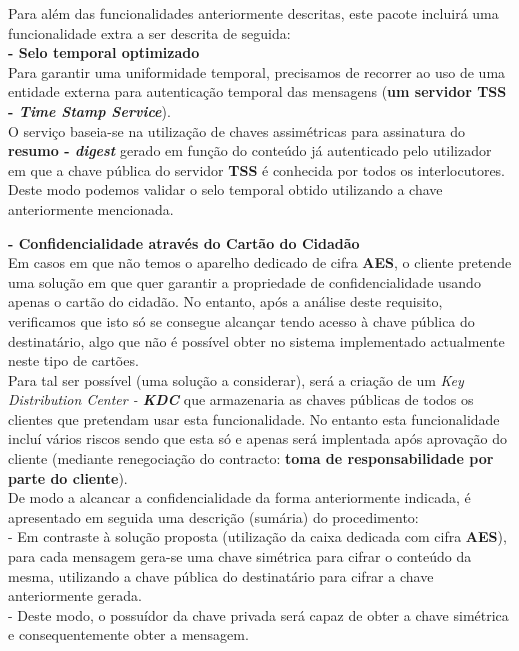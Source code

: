 \documentclass[times, 10pt,twocolumn]{article}
\begin{document}

Para al\'em das funcionalidades anteriormente descritas, este pacote incluir\'a uma funcionalidade extra a ser descrita de seguida:\\

\noindent \textbf{- Selo temporal optimizado}\\
\indent Para garantir uma uniformidade temporal, precisamos de recorrer ao uso de uma entidade externa para autentica\c{c}\~ao temporal das mensagens (\textbf{um servidor TSS - \emph{Time Stamp Service}}). \\
\indent O servi\c{c}o baseia-se na utiliza\c{c}\~ao de chaves assim\'etricas para assinatura do \textbf{resumo - \emph{digest}} gerado em fun\c{c}\~ao do conte\'udo j\'a autenticado pelo utilizador em que a chave p\'ublica do servidor \textbf{TSS} \'e conhecida por todos os interlocutores. Deste modo podemos validar o selo temporal obtido utilizando a chave anteriormente mencionada.


\noindent \textbf{- Confidencialidade atrav\'es do Cart\~ao do Cidad\~ao}\\
\indent Em casos em que n\~ao temos o aparelho dedicado de cifra \textbf{AES}, o cliente pretende uma solu\c{c}\~ao em que quer garantir a propriedade de confidencialidade usando apenas o cart\~ao do cidad\~ao. No entanto, ap\'os a an\'alise deste requisito, verificamos que isto s\'o se consegue alcan\c{c}ar tendo acesso \`a chave p\'ublica do destinat\'ario, algo que n\~ao \'e poss\'ivel obter no sistema implementado actualmente neste tipo de cart\~oes.\\
\indent Para tal ser poss\'ivel (uma solu\c{c}\~ao a considerar), ser\'a a cria\c{c}\~ao de um \emph{Key Distribution Center - \textbf{KDC}} que armazenaria as chaves p\'ublicas de todos os clientes que pretendam usar esta funcionalidade. No entanto esta funcionalidade inclu\'i v\'arios riscos sendo que esta s\'o e apenas ser\'a implentada ap\'os aprova\c{c}\~ao do cliente (mediante renegocia\c{c}\~ao do contracto: \textbf{toma de responsabilidade por parte do cliente}).\\
\indent De modo a alcancar a confidencialidade da forma anteriormente indicada, \'e apresentado em seguida uma descri\c{c}\~ao (sum\'aria) do procedimento:\\
\indent \indent - Em contraste \`a solu\c{c}\~ao proposta (utiliza\c{c}\~ao da caixa dedicada com cifra \textbf{AES}), para cada mensagem gera-se uma chave sim\'etrica para cifrar o conte\'udo da mesma, utilizando a chave p\'ublica do destinat\'ario para cifrar a chave anteriormente gerada.\\
\indent \indent - Deste modo, o possu\'idor da chave privada ser\'a capaz de obter a chave sim\'etrica e consequentemente obter a mensagem.\\
\end{document}
